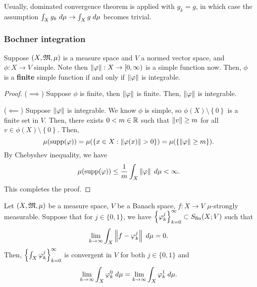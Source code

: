 \documentclass[a4paper]{article}
\begin{document}
\begin{remark}
Usually, dominated convergence theorem is applied with 
$g_k = g$, in which case the assumption 
$\int_X g_k \; d \mu \to \int_X g \; d \mu$ becomes trivial.
\end{remark}

\subsubsection{Bochner integration}
\begin{lemma}
Suppose $(X, \mathfrak{M}, \mu)$ is a measure space and $V$ a normed 
vector space, and $\phi: X \to V$ simple. 
Note then $\left\lVert \varphi\right\rVert : X \to [0, \infty)$ 
is a simple function now. 
Then, $\phi$ is a \textbf{finite} simple function
if and only if $\left\lVert \varphi\right\rVert$ is integrable. 
\end{lemma}

\begin{proof}
($\implies$) Suppose $\phi$ is finite, then 
$\left\lVert \varphi\right\rVert$ is finite. Then, $\left\lVert \varphi\right\rVert$ is integrable.

($\impliedby$) Suppose $\left\lVert \varphi\right\rVert$ is integrable. We know 
$\phi$ is simple, so $\phi(X) \setminus \left\{ 0 \right\}$
is a finite set in $V$. Then, there exists $0 < m \in \mathbb{R}$ such 
that $\left\lVert v\right\rVert \geq m$ for all $v \in \phi(X) \setminus \left\{ 
0 \right\}$. Then, 
\[
\mu(\operatorname{supp}(\varphi)) = \mu(\{x \in X : \left\lVert \varphi(x)\right\rVert > 0\})
= \mu(\{\left\lVert \varphi\right\rVert \geq m\}).
\]
By Chebyshev inequality, we have 
\[
\mu(\operatorname{supp}(\varphi)) \leq \frac{1}{m} \int_X \left\lVert \varphi\right\rVert \; d \mu < \infty.
\]
This completes the proof.
\end{proof}

\begin{lemma}
Let $(X, \mathfrak{M}, \mu)$ be a measure space, $V$ be a Banach space,
$f: X \to V$ $\mu$-strongly measurable. Suppose that for 
$j \in \{0, 1\}$, we have $\left\{ \varphi_k^j \right\}_{k=0}^\infty \subset S_{\text{fin}}(X; V)$
such that 
\[
  \lim_{k \to \infty} \int_X \left\lVert f - \varphi_k^j\right\rVert \; d \mu = 0.
\]
Then, $\left\{ \int_X \varphi_k^j \right\}_{k=0}^\infty$ is convergent in $V$ 
for both $j \in \{0, 1\}$ and 
\[
\lim_{k \to \infty} \int_X \varphi_k^0 \; d \mu = 
\lim_{k \to \infty} \int_X \varphi_k^1 \; d \mu.
\]
\end{lemma}
\end{document}
